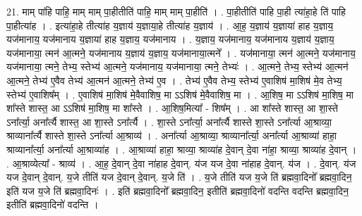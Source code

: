 \documentclass[17pt]{extarticle}
\begin{document}
21. माम् पा॑हि पाहि॒ माम् माम् पा॒हीतीति॑ पाहि॒ माम् माम् पा॒हीति॑ । . पा॒हीतीति॑ पाहि पा॒ही त्या॑हा॒हे ति॑ पाहि पा॒हीत्या॑ह । . इत्या॑हा॒हे तीत्या॑ह य॒ज्ञाय॑ य॒ज्ञाया॒हे तीत्या॑ह य॒ज्ञाय॑ । . आ॒ह॒ य॒ज्ञाय॑ य॒ज्ञाया॑ हाह य॒ज्ञाय॒ यज॑मानाय॒ यज॑मानाय य॒ज्ञाया॑ हाह य॒ज्ञाय॒ यज॑मानाय । . य॒ज्ञाय॒ यज॑मानाय॒ यज॑मानाय य॒ज्ञाय॑ य॒ज्ञाय॒ यज॑मानाया॒ त्मन॑ आ॒त्मने॒ यज॑मानाय य॒ज्ञाय॑ य॒ज्ञाय॒ यज॑मानाया॒त्मने᳚ । . यज॑मानाया॒ त्मन॑ आ॒त्मने॒ यज॑मानाय॒ यज॑मानाया॒ त्मने॒ तेभ्य॒ स्तेभ्य॑ आ॒त्मने॒ यज॑मानाय॒ यज॑मानाया॒ त्मने॒ तेभ्यः॑ । . आ॒त्मने॒ तेभ्य॒ स्तेभ्य॑ आ॒त्मन॑ आ॒त्मने॒ तेभ्य॑ ए॒वैव तेभ्य॑ आ॒त्मन॑ आ॒त्मने॒ तेभ्य॑ ए॒व । . तेभ्य॑ ए॒वैव तेभ्य॒ स्तेभ्य॑ ए॒वाशिष॑ मा॒शिष॑ मे॒व तेभ्य॒ स्तेभ्य॑ ए॒वाशिष᳚म् । . ए॒वाशिष॑ मा॒शिष॑ मे॒वैवाशिष॒ मा ऽऽशिष॑ मे॒वैवाशिष॒ मा । . आ॒शिष॒ मा ऽऽशिष॑ मा॒शिष॒ मा शा᳚स्ते शास्त॒ आ ऽऽशिष॑ मा॒शिष॒ मा शा᳚स्ते । . आ॒शिष॒मित्या᳚ - शिष᳚म् । . आ शा᳚स्ते शास्त॒ आ शा॒स्ते ऽना᳚र्त्या॒ अना᳚र्त्यै शास्त॒ आ शा॒स्ते ऽना᳚र्त्यै । . शा॒स्ते ऽना᳚र्त्या॒ अना᳚र्त्यै शास्ते शा॒स्ते ऽना᳚र्त्या आ॒श्राव्या॒ श्राव्याना᳚र्त्यै शास्ते शा॒स्ते ऽना᳚र्त्या आ॒श्राव्य॑ । . अना᳚र्त्या आ॒श्राव्या॒ श्राव्याना᳚र्त्या॒ अना᳚र्त्या आ॒श्राव्या॑ हाहा॒ श्राव्याना᳚र्त्या॒ अना᳚र्त्या आ॒श्राव्या॑ह । . आ॒श्राव्या॑ हाहा॒ श्राव्या॒ श्राव्या॑ह दे॒वान् दे॒वा ना॑हा॒ श्राव्या॒ श्राव्या॑ह दे॒वान् । . आ॒श्राव्येत्या᳚ - श्राव्य॑ । . आ॒ह॒ दे॒वान् दे॒वा ना॑हाह दे॒वान्. य॑ज यज दे॒वा ना॑हाह दे॒वान्. य॑ज । . दे॒वान्. य॑ज यज दे॒वान् दे॒वान्. य॒जे तीति॑ यज दे॒वान् दे॒वान्. य॒जे ति॑ । . य॒जे तीति॑ यज य॒जे ति॑ ब्रह्मवा॒दिनो᳚ ब्रह्मवा॒दिन॒ इति॑ यज य॒जे ति॑ ब्रह्मवा॒दिनः॑ । . इति॑ ब्रह्मवा॒दिनो᳚ ब्रह्मवा॒दिन॒ इतीति॑ ब्रह्मवा॒दिनो॑ वदन्ति वदन्ति ब्रह्मवा॒दिन॒ इतीति॑ ब्रह्मवा॒दिनो॑ वदन्ति । \newline
\end{document}
